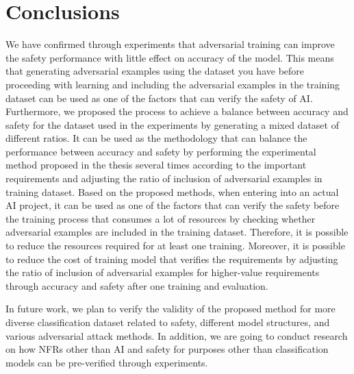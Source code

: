 \documentclass[journal,article,submit,moreauthors,pdftex]{Definitions/mdpi}
\begin{document}
\section{Conclusions}

We have confirmed through experiments that adversarial training can improve the safety performance with little effect on accuracy of the model.
This means that generating adversarial examples using the dataset you have before proceeding with learning and including the adversarial examples in the training dataset can be used as one of the factors that can verify the safety of AI.
Furthermore, we proposed the process to achieve a balance between accuracy and safety for the dataset used in the experiments by generating a mixed dataset of different ratios.
It can be used as the methodology that can balance the performance between accuracy and safety by performing the experimental method proposed in the thesis several times according to the important requirements and adjusting the ratio of inclusion of adversarial examples in training dataset.
Based on the proposed methods, when entering into an actual AI project, it can be used as one of the factors that can verify the safety before the training process that consumes a lot of resources by checking whether adversarial examples are included in the training dataset.
Therefore, it is possible to reduce the resources required for at least one training.
Moreover, it is possible to reduce the cost of training model that verifies the requirements by adjusting the ratio of inclusion of adversarial examples for higher-value requirements through accuracy and safety after one training and evaluation.

In future work, we plan to verify the validity of the proposed method for more diverse classification dataset related to safety, different model structures, and various adversarial attack methods.
In addition, we are going to conduct research on how NFRs other than AI and safety for purposes other than classification models can be pre-verified through experiments.

\vspace{6pt} 


\end{document}
